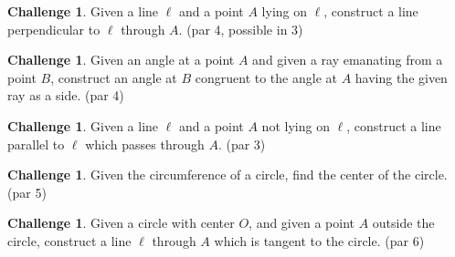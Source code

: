 \documentclass{tufte-handout}
\theoremstyle{definition}
\newtheorem{challenge}[problem]{Challenge}
\begin{document}
\begin{challenge}\label{chal:perp-pt-on-line}
Given a line $\ell$ and a point $A$ lying on $\ell$, construct a line perpendicular to $\ell$ through $A$. (par 4, possible in 3)
\end{challenge}

\begin{challenge}\label{chal:copy-angle}
Given an angle at a point $A$ and given a ray emanating from a point $B$, construct an angle at $B$ congruent to the angle at $A$ having the given ray as a side. (par 4)
\end{challenge}

\begin{challenge}\label{chal:parallel}
Given a line $\ell$ and a point $A$ not lying on $\ell$, construct a line parallel to $\ell$ which passes through $A$. (par 3)
\end{challenge}

\begin{challenge}\label{chal:circle-center}
Given the circumference of a circle, find the center of the circle. (par 5)
\end{challenge}

\begin{challenge}\label{chal:tangent-circle-point}
Given a circle with center $O$, and given a point $A$ outside the circle, construct a line $\ell$ through $A$ which is tangent to the circle. (par 6)
\end{challenge}

\vfill
\end{document}
